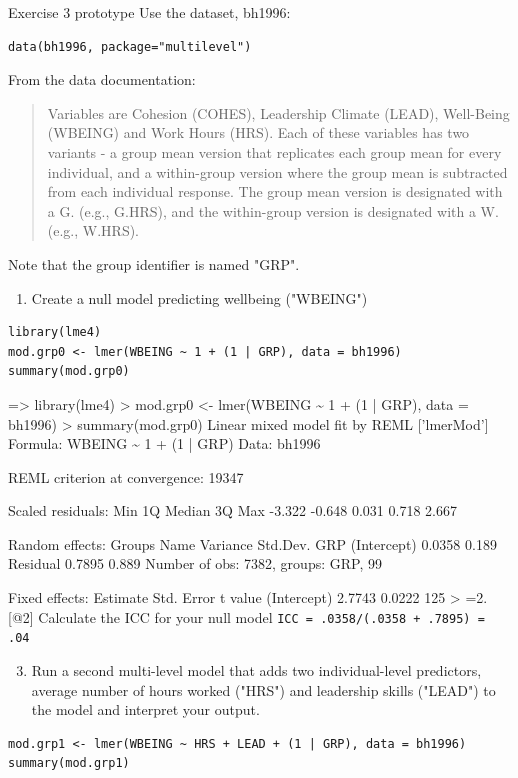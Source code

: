 \documentclass[table,smaller]{beamer}
\begin{document}
\begin{frame}[fragile,label=sec-6-4]{Exercise 3 prototype}
 Use the dataset, bh1996:
\begin{verbatim}
data(bh1996, package="multilevel")
\end{verbatim}

From the data documentation:
\begin{quote}
Variables are Cohesion (COHES), Leadership Climate (LEAD),
Well-Being (WBEING) and Work Hours (HRS).  Each of these variables
has two variants - a group mean version that replicates each group
mean for every individual, and a within-group version where the
group mean is subtracted from each individual response.  The group
mean version is designated with a G. (e.g., G.HRS), and the
within-group version is designated with a W. (e.g., W.HRS).
\end{quote}
Note that the group identifier is named "GRP".
\begin{enumerate}
\setcounter{enumi}{0}
\item Create a null model predicting wellbeing ("WBEING")
\end{enumerate}
\begin{verbatim}
library(lme4)
mod.grp0 <- lmer(WBEING ~ 1 + (1 | GRP), data = bh1996)
summary(mod.grp0)
\end{verbatim}
=> library(lme4)
> mod.grp0 <- lmer(WBEING \textasciitilde{} 1 + (1 | GRP), data = bh1996)
> summary(mod.grp0)
Linear mixed model fit by REML ['lmerMod']
Formula: WBEING \textasciitilde{} 1 + (1 | GRP)
   Data: bh1996

REML criterion at convergence: 19347

Scaled residuals: 
   Min     1Q Median     3Q    Max 
-3.322 -0.648  0.031  0.718  2.667 

Random effects:
 Groups   Name        Variance Std.Dev.
 GRP      (Intercept) 0.0358   0.189   
 Residual             0.7895   0.889   
Number of obs: 7382, groups:  GRP, 99

Fixed effects:
            Estimate Std. Error t value
(Intercept)   2.7743     0.0222     125
> 
=2. [@2] Calculate the ICC for your null model
 \verb~ICC = .0358/(.0358 + .7895) = .04~
\begin{enumerate}
\setcounter{enumi}{2}
\item Run a second multi-level model that adds two individual-level predictors, average number of hours worked ("HRS") and leadership skills ("LEAD") to the model and interpret your output.
\end{enumerate}
\begin{verbatim}
mod.grp1 <- lmer(WBEING ~ HRS + LEAD + (1 | GRP), data = bh1996)
summary(mod.grp1)
\end{verbatim}


\end{frame}
\end{document}
